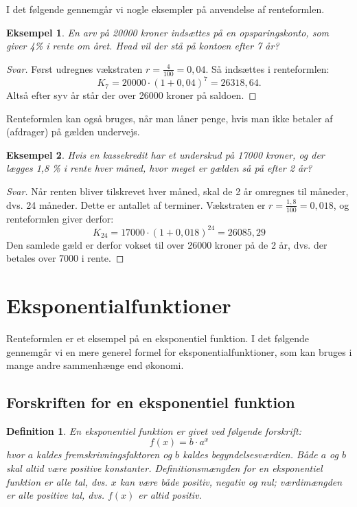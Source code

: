 \documentclass[12pt,oneside,a4paper]{article}
\theoremstyle{plain}
\newtheorem*{mydef}{Definition}
\newtheorem*{eks}{Eksempel}
\begin{document}
I det følgende gennemgår vi nogle eksempler på anvendelse af renteformlen.
\begin{eks}
    En arv på 20000 kroner indsættes på en opsparingskonto, som
    giver 4\% i rente om året. Hvad vil der stå på kontoen efter 7 år?
\end{eks}
\begin{proof}[Svar]
    Først udregnes vækstraten $r=\frac{4}{100} = 0,04$. Så indsættes i renteformlen:
    $$
    K_7 = 20000 \cdot (1 + 0,04)^7 = 26318,64.
    $$
    Altså efter syv år står der over 26000 kroner på saldoen.
\end{proof}

Renteformlen kan også bruges, når man låner penge, hvis man ikke betaler af
(afdrager) på gælden undervejs.
\begin{eks}
    Hvis en kassekredit har et underskud på 17000 kroner, og der
    lægges 1,8 \% i rente hver måned, hvor meget er gælden så på efter 2 år?
\end{eks}
\begin{proof}[Svar]
    Når renten bliver tilskrevet hver måned, skal de 2 år omregnes til
    måneder, dvs. 24 måneder. Dette er antallet af terminer. Vækstraten er $r =
    \frac{1,8}{100} = 0,018$, og renteformlen giver derfor:
    $$
    K_{24} = 17000 \cdot (1 + 0,018)^{24} = 26085,29
    $$
    Den samlede gæld er derfor vokset til over 26000 kroner på de 2 år, dvs.
    der betales over 7000 i rente.
\end{proof}

\section*{Eksponentialfunktioner}
Renteformlen er et eksempel på en eksponentiel funktion. I det følgende
gennemgår vi en mere generel formel for eksponentialfunktioner, som kan
bruges i mange andre sammenhænge end økonomi.

\subsection*{Forskriften for en eksponentiel funktion}
\begin{mydef}
    En eksponentiel funktion er givet ved følgende forskrift:
    $$
    f(x) = b\cdot a^x
    $$
    hvor $a$ kaldes {\em fremskrivningsfaktoren} og $b$ kaldes {\em
    begyndelsesværdien}. Både $a$ og $b$ skal altid være positive konstanter.
    Definitionsmængden for en eksponentiel funktion er alle tal, dvs. $x$ kan
    være både positiv, negativ og nul; værdimængden er alle positive tal, dvs.
    $f(x)$ er altid positiv.
\end{mydef}
\end{document}
